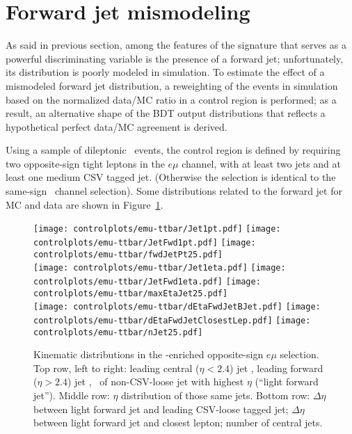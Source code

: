 \section{Forward jet mismodeling}

\label{sec:forward_jet_model}

As said in previous section, among the features of the \tHq signature that serves as a powerful discriminating variable is the presence of a forward jet; unfortunately, its \etac distribution is poorly modeled in simulation. To estimate the effect of a mismodeled forward jet distribution, a reweighting of the events in simulation based on the normalized data/MC ratio in a control region is performed; as a result, an alternative shape of the BDT output distributions that reflects a hypothetical perfect data/MC agreement is derived.

Using a sample of dileptonic \ttbar\ events, the control region is defined by requiring two opposite-sign tight leptons in the $e\mu$ channel, with at least two jets and at least one medium CSV tagged jet. (Otherwise the selection is identical to the same-sign \emu\ channel selection). Some distributions related to the forward jet for MC and data are shown in Figure~\ref{fig:osemu-ttbar}.

\begin{figure} [!h]
  \centering
  \texttt{[image: controlplots/emu-ttbar/Jet1pt.pdf]}
  \texttt{[image: controlplots/emu-ttbar/JetFwd1pt.pdf]}
  \texttt{[image: controlplots/emu-ttbar/fwdJetPt25.pdf]} \\
  \texttt{[image: controlplots/emu-ttbar/Jet1eta.pdf]}
  \texttt{[image: controlplots/emu-ttbar/JetFwd1eta.pdf]}
  \texttt{[image: controlplots/emu-ttbar/maxEtaJet25.pdf]} \\
  \texttt{[image: controlplots/emu-ttbar/dEtaFwdJetBJet.pdf]}
  \texttt{[image: controlplots/emu-ttbar/dEtaFwdJetClosestLep.pdf]}
  \texttt{[image: controlplots/emu-ttbar/nJet25.pdf]} \\
\caption[Kinematic distributions for forward jet mismodeling study.]{Kinematic distributions in the \ttbar-enriched opposite-sign $e\mu$ selection. Top row, left to right: leading central ($\eta<2.4$) jet \pt, leading forward ($\eta>2.4$) jet \pt, \pt\ of non-CSV-loose jet with highest $\eta$ (``light forward jet''). Middle row: $\eta$ distribution of those same jets. Bottom row: $\Delta\eta$ between light forward jet and leading CSV-loose tagged jet; $\Delta\eta$ between light forward jet and closest lepton; number of central jets.}
\label{fig:osemu-ttbar}
\end{figure}

